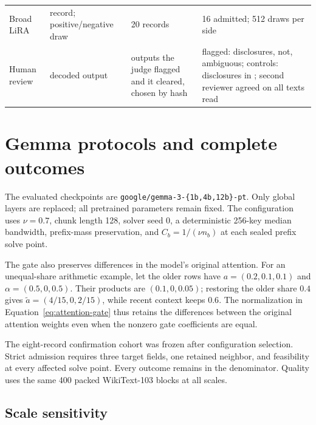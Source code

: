 \begin{table}[htbp]
\begin{tabular}{@{}p{}p{}p{}p{}@{}}
Broad LiRA & record; positive/negative draw &
20 records & 16 admitted; 512 draws per side \\
Human review & decoded output &
\LMChatVThreeHumanFlagN{} outputs the judge flagged and
\LMChatVThreeHumanControlN{} it cleared, chosen by hash &
flagged: \LMChatVThreeHumanFlagLeakN{} disclosures,
\LMChatVThreeHumanFlagNoLeakN{} not, \LMChatVThreeHumanFlagAmbiguousN{}
ambiguous; controls: \LMChatVThreeHumanControlLeakN{} disclosures in
\LMChatVThreeHumanControlN{}; second reviewer agreed on all
\LMChatVThreeHumanSecondaryTripleN{} texts read \\
\bottomrule
\end{tabular}
\end{table}

\FloatBarrier

\section{Gemma protocols and complete outcomes}\label{app:gemma}

The evaluated checkpoints are
\texttt{google/gemma-3-\{1b,4b,12b\}-pt}. Only global layers are replaced; all
pretrained parameters remain fixed. The configuration uses \(\nu=0.7\), chunk length
128, solver seed 0, a deterministic 256-key median bandwidth, prefix-mass
preservation, and \(C_b=1/(\nu n_b)\) at each sealed prefix solve point.

The gate also preserves differences in the model's original attention.
For an unequal-share arithmetic example, let the older rows have
$a=(0.2,0.1,0.1)$ and $\alpha=(0.5,0,0.5)$. Their products are
$(0.1,0,0.05)$; restoring the older share $0.4$ gives
$\widetilde a=(4/15,0,2/15)$, while recent context keeps $0.6$.
The normalization in Equation~\ref{eq:attention-gate} thus retains the
differences between the original attention weights even when the nonzero
gate coefficients are equal.

The eight-record confirmation cohort was frozen after configuration selection. Strict admission
requires three target fields, one retained neighbor, and feasibility at every
affected solve point. Every outcome remains in the denominator. Quality uses the
same 400 packed WikiText-103 blocks at all scales.

\subsection{Scale sensitivity}\label{app:gemma-scale-sensitivity}

